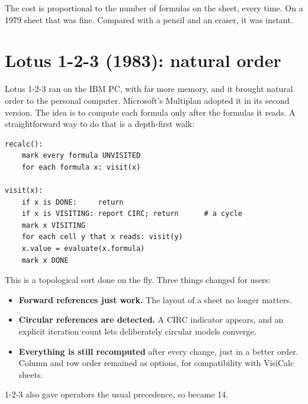 \documentclass[11pt]{article}
\begin{document}

The cost is proportional to the number of formulas on the sheet, every
time. On a 1979 sheet that was fine. Compared with a pencil and an eraser,
it was instant.

\section{Lotus 1-2-3 (1983): natural order}

Lotus 1-2-3 ran on the IBM PC, with far more memory, and it brought natural
order to the personal computer. Microsoft's Multiplan adopted it in its
second version. The idea is to compute each formula only after the formulas
it reads. A straightforward way to do that is a depth-first walk:

\begin{lstlisting}
recalc():
    mark every formula UNVISITED
    for each formula x: visit(x)

visit(x):
    if x is DONE:     return
    if x is VISITING: report CIRC; return      # a cycle
    mark x VISITING
    for each cell y that x reads: visit(y)
    x.value = evaluate(x.formula)
    mark x DONE
\end{lstlisting}

This is a topological sort done on the fly. Three things changed for users:

\begin{itemize}
\item \textbf{Forward references just work.} The layout of a sheet no
  longer matters.
\item \textbf{Circular references are detected.} A \textsf{CIRC} indicator
  appears, and an explicit iteration count lets deliberately circular models
  converge.
\item \textbf{Everything is still recomputed} after every change, just in
  a better order. Column and row order remained as options, for
  compatibility with VisiCalc sheets.
\end{itemize}

1-2-3 also gave operators the usual precedence, so  became 14.


\end{document}
